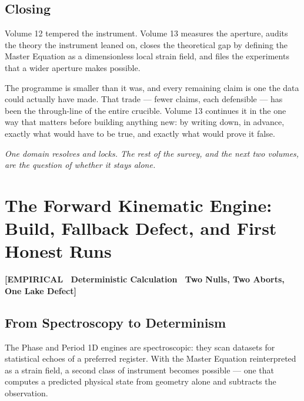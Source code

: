 \documentclass[11pt, letterpaper, openany]{book}
\begin{document}
\section{Closing}

Volume 12 tempered the instrument. Volume 13 measures the aperture, audits the theory the instrument
leaned on, closes the theoretical gap by defining the Master Equation as a dimensionless local strain field, and files the experiments that a wider aperture makes possible. 

The programme is smaller than it was, and every remaining claim is one the data could actually have
made. That trade --- fewer claims, each defensible --- has been the through-line of the entire
crucible. Volume 13 continues it in the one way that matters before building anything new: by writing
down, in advance, exactly what would have to be true, and exactly what would prove it false.

\begin{center}
\vspace{0.5em}
\itshape One domain resolves and locks. The rest of the survey, and the next two volumes, are the
question of whether it stays alone.
\vspace{0.5em}
\end{center}

\chapter{The Forward Kinematic Engine: Build, Fallback Defect, and First Honest Runs}

\begin{center}
{\color{theorytag}\textbf{[EMPIRICAL \textbullet\ Deterministic Calculation \textbullet\ Two Nulls, Two Aborts, One Lake Defect]}}
\end{center}

\section{From Spectroscopy to Determinism}

The Phase and Period 1D engines are spectroscopic: they scan datasets for statistical echoes of a
preferred register. With the Master Equation reinterpreted as a strain field, a second class of
instrument becomes possible --- one that computes a predicted physical state from geometry alone and
subtracts the observation.
\end{document}
